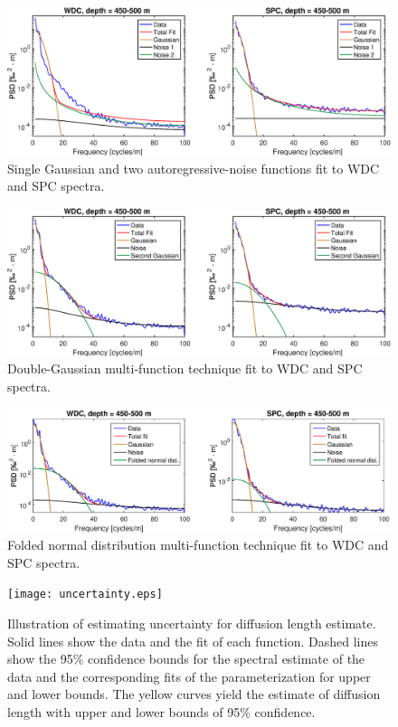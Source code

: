 \documentclass[draft, jgrga]{AGUTeX}
\begin{document}
\begin{figure}
\includegraphics[width=.9\linewidth]{GRR_fits.eps}
\caption{Single Gaussian and two autoregressive-noise functions fit to WDC and SPC spectra.}\label{GRR_fits}
\end{figure}

\begin{figure}
\includegraphics[width=.9\linewidth]{GGR_fits.eps}
\caption{Double-Gaussian multi-function technique fit to WDC and SPC spectra.}\label{GGR_fits}
\end{figure}

\begin{figure}
	\includegraphics[width=1.1\linewidth]{folded_normal_gauss_spectrum.eps}
	\caption{Folded normal distribution multi-function technique fit to WDC and SPC spectra.}\label{folded_normal_gauss_spectrum}
\end{figure}

\begin{figure}
	\texttt{[image: uncertainty.eps]}
	\caption{Illustration of estimating uncertainty for diffusion length estimate. Solid lines show the data and the fit of each function. Dashed lines show the 95\% confidence bounds for the spectral estimate of the data and the corresponding fits of the parameterization for upper and lower bounds. The yellow curves yield the estimate of diffusion length with upper and lower bounds of 95\% confidence.}\label{uncertainty}
\end{figure}
\end{document}
